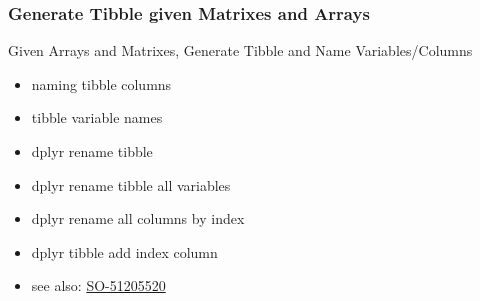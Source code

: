 \documentclass[
]{book}
\providecommand{\tightlist}{%
  \setlength{\itemsep}{0pt}\setlength{\parskip}{0pt}}
\begin{document}
\hypertarget{generate-tibble-given-matrixes-and-arrays}{%
\subsubsection{Generate Tibble given Matrixes and Arrays}\label{generate-tibble-given-matrixes-and-arrays}}

Given Arrays and Matrixes, Generate Tibble and Name Variables/Columns

\begin{itemize}
\tightlist
\item
  naming tibble columns
\item
  tibble variable names
\item
  dplyr rename tibble
\item
  dplyr rename tibble all variables
\item
  dplyr rename all columns by index
\item
  dplyr tibble add index column
\item
  see also: \href{https://stackoverflow.com/questions/45535157/difference-between-dplyrrename-and-dplyrrename-all}{SO-51205520}
\end{itemize}
\end{document}
